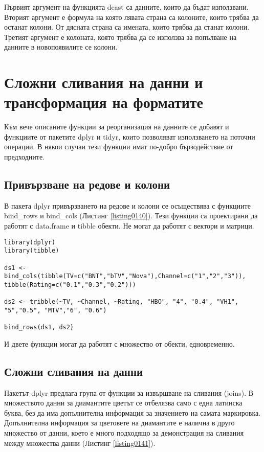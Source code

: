 Първият аргумент на функцията dcast са данните, които да бъдат използвани. Вторият аргумент е формула на която лявата страна са колоните, които трябва да останат колони. От дясната страна са имената, които трябва да станат колони. Третият аргумент е колоната, която трябва да се използва за попълване на данните в новопоявилите се колони. 

\section{Сложни сливания на данни и трансформация на форматите}

Към вече описаните функции за реорганизация на данните се добавят и функциите от пакетите dplyr и tidyr, които позволяват използването на поточни операции. В някои случаи тези функции имат по-добро бързодействие от предходните. 

\subsection{Привързване на редове и колони}

В пакета dplyr привързването на редове и колони се осъществява с функциите bind\_rows и bind\_cols (Листинг \ref{listing0140}). Тези функции са проектирани да работят с data.frame и tibble обекти. Не могат да работят с вектори и матрици. 

\begin{lstlisting}[caption=Обединяване по колони и редове, label=listing0140]
library(dplyr)
library(tibble)

ds1 <- bind_cols(tibble(TV=c("BNT","bTV","Nova"),Channel=c("1","2","3")), tibble(Rating=c("0.1","0.3","0.2")))

ds2 <- tribble(~TV, ~Channel, ~Rating, "HBO", "4", "0.4", "VH1", "5","0.5", "MTV","6", "0.6")

bind_rows(ds1, ds2)
\end{lstlisting}

И двете функции могат да работят с множество от обекти, едновременно.

\subsection{Сложни сливания на данни}

Пакетът dplyr предлага група от функции за извършване на сливания (joins). В множеството данни за диамантите цветът се отбелязва само с една латинска буква, без да има допълнителна информация за значението на самата маркировка. Допълнителна информация за цветовете на диамантите е налична в друго множество от данни, което е много подходящо за демонстрация на сливания между множества данни (Листинг \ref{listing0141}).

